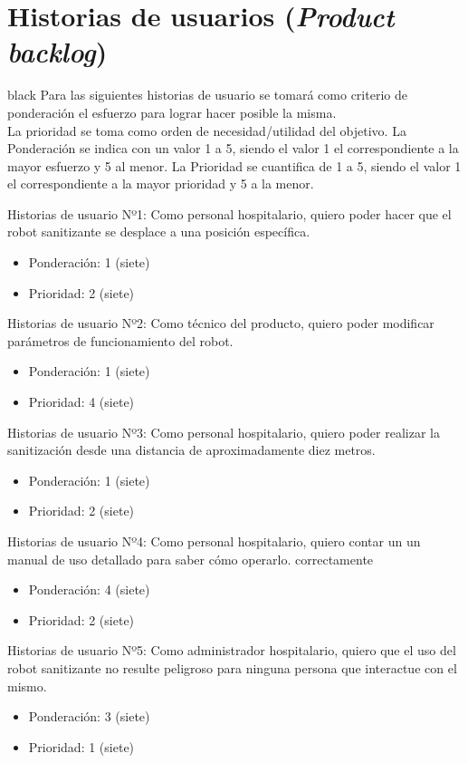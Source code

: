 \documentclass[11pt]{charter}
\begin{document}
\section{Historias de usuarios (\textit{Product backlog})}
\label{sec:backlog}
\begin{consigna}{black}
Para las siguientes historias de usuario se tomará como criterio de ponderación el esfuerzo para lograr hacer posible la misma.\\
La prioridad se toma como orden de necesidad/utilidad del objetivo. 
La Ponderación se indica con un valor 1 a 5, siendo el valor 1 el correspondiente a la mayor esfuerzo y 5 al menor.
La Prioridad se cuantifica de 1 a 5, siendo el valor 1 el correspondiente a la mayor prioridad y 5 a la menor.

Historias de usuario Nº1: Como personal hospitalario, quiero poder hacer que el robot sanitizante se desplace a una posición específica. 
\begin{itemize}
\item Ponderación: 1 (siete)
\item Prioridad: 2 (siete)
\end{itemize}  

Historias de usuario Nº2: Como técnico del producto, quiero poder modificar parámetros de funcionamiento del robot.
\begin{itemize}
\item Ponderación: 1 (siete)
\item Prioridad: 4 (siete)
\end{itemize}  

Historias de usuario Nº3: Como personal hospitalario, quiero poder realizar la sanitización desde una distancia de aproximadamente diez metros.
\begin{itemize}
\item Ponderación: 1 (siete)
\item Prioridad: 2 (siete)
\end{itemize}  

Historias de usuario Nº4: Como personal hospitalario, quiero contar un un manual de uso detallado para saber cómo operarlo. correctamente
\begin{itemize}
\item Ponderación: 4 (siete)
\item Prioridad: 2 (siete)
\end{itemize}  

Historias de usuario Nº5: Como administrador hospitalario, quiero que el uso del robot sanitizante no resulte peligroso para ninguna persona que interactue con el mismo.
\begin{itemize}
\item Ponderación: 3 (siete)
\item Prioridad: 1 (siete)
\end{itemize}  


\end{consigna}
\end{document}
